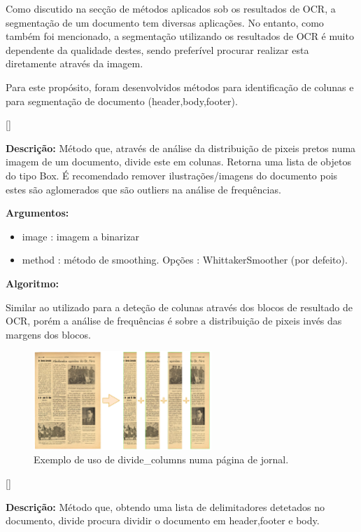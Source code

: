 Como discutido na secção de métodos aplicados sob os resultados de OCR, a segmentação de um documento tem diversas aplicações. No entanto, como também foi mencionado, a segmentação utilizando os resultados de OCR é muito dependente da qualidade destes, sendo preferível procurar realizar esta diretamente através da imagem.

Para este propósito, foram desenvolvidos métodos para identificação de colunas e para segmentação de documento (header,body,footer).

[\normalsize]

\textbf{Descrição:} Método que, através de análise da distribuição de pixeis pretos numa imagem de um documento, divide este em colunas. Retorna uma lista de objetos do tipo Box.
É recomendado remover ilustrações/imagens do documento pois estes são aglomerados que são outliers na análise de frequências.

\textbf{Argumentos:}
\begin{itemize}\setlength\itemsep{-0.3em}
	\item image : imagem a binarizar
	\item method : método de smoothing. Opções : WhittakerSmoother (por defeito).
\end{itemize}

\textbf{Algoritmo:} 

Similar ao utilizado para a deteção de colunas através dos blocos de resultado de OCR, porém a análise de frequências é sobre a distribuição de pixeis invés das margens dos blocos.


\begin{figure}[H]
	\centering
	\includegraphics[width=0.6\textwidth]{images/ilustracoes/divide_columns_example.png}
	\caption{Exemplo de uso de divide\_columns numa página de jornal.}
	\label{fig:divide_columns_example}
\end{figure}


[\normalsize]

\textbf{Descrição:} Método que, obtendo uma lista de delimitadores detetados no documento, divide procura dividir o documento em header,footer e body.


